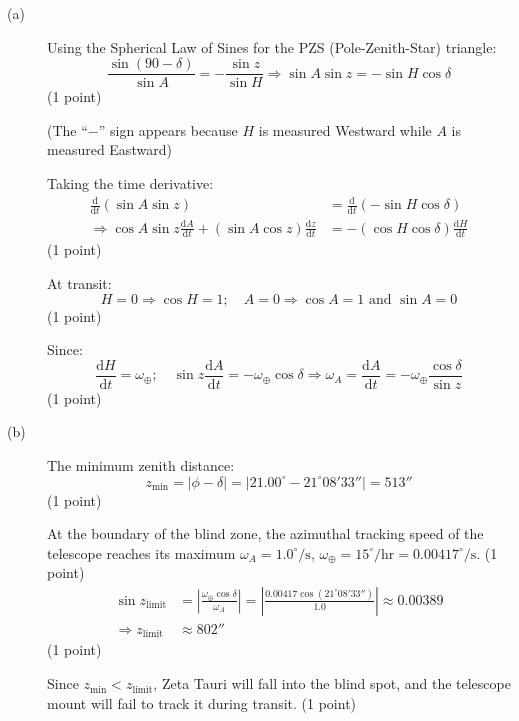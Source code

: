 \begin{description}
\item[(a)] Using the Spherical Law of Sines for the PZS (Pole-Zenith-Star)
  triangle:
  \[ \frac{\sin(90 - \delta)}{\sin A} = -\frac{\sin z}{\sin H}
     \Longrightarrow \sin A \sin z = -\sin H \cos\delta \]
  \hfill(1 point)

  (The ``$-$'' sign appears because $H$ is measured Westward while $A$ is
  measured Eastward)

  Taking the time derivative:
  \begin{align*}
    \frac{\mathrm{d}}{\mathrm{d}t}(\sin A \sin z)
      &= \frac{\mathrm{d}}{\mathrm{d}t}(-\sin H \cos\delta) \\
    \Longrightarrow \cos A \sin z \frac{\mathrm{d}A}{\mathrm{d}t}
      + (\sin A \cos z)\frac{\mathrm{d}z}{\mathrm{d}t}
      &= -(\cos H \cos\delta)\frac{\mathrm{d}H}{\mathrm{d}t}
  \end{align*}
  \hfill(1 point)

  At transit:
  \[ H = 0 \Longrightarrow \cos H = 1;\quad
     A = 0 \Longrightarrow \cos A = 1 \text{ and } \sin A = 0 \]
  \hfill(1 point)

  Since:
  \[ \frac{\mathrm{d}H}{\mathrm{d}t} = \omega_\oplus;\quad
     \sin z \frac{\mathrm{d}A}{\mathrm{d}t} = -\omega_\oplus \cos\delta
     \Longrightarrow \omega_A = \frac{\mathrm{d}A}{\mathrm{d}t}
     = -\omega_\oplus \frac{\cos\delta}{\sin z} \]
  \hfill(1 point)

\item[(b)] The minimum zenith distance:
  \[ z_{\mathrm{min}} = |\phi - \delta|
     = |21.00^\circ - 21^\circ 08' 33''| = 513'' \]
  \hfill(1 point)

  At the boundary of the blind zone, the azimuthal tracking speed of the
  telescope reaches its maximum $\omega_A = 1.0^\circ/\mathrm{s}$,
  $\omega_\oplus = 15^\circ/\mathrm{hr} = 0.00417^\circ/\mathrm{s}$.
  \hfill(1 point)
  \begin{align*}
    \sin z_{\mathrm{limit}}
      &= \left|\frac{\omega_\oplus \cos\delta}{\omega_A}\right|
       = \left|\frac{0.00417 \cos(21^\circ 08' 33'')}{1.0}\right|
       \approx 0.00389 \\
    \Longrightarrow z_{\mathrm{limit}} &\approx 802''
  \end{align*}
  \hfill(1 point)

  Since $z_{\mathrm{min}} < z_{\mathrm{limit}}$, Zeta Tauri will fall into the
  blind spot, and the telescope mount will fail to track it during transit.
  \hfill(1 point)


\end{description}
